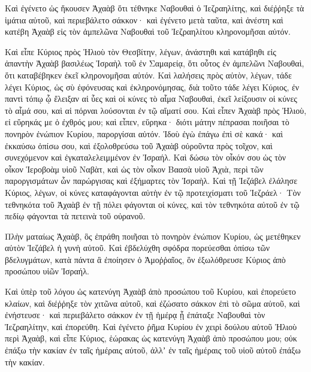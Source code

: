 {Καὶ ἐγένετο ὡς ἤκουσεν Ἀχαὰβ ὅτι τέθνηκε Ναβουθαὶ ὁ Ἰεζραηλίτης, καὶ διέῤῥηξε τὰ ἱμάτια αὐτοῦ, καὶ περιεβάλετο σάκκον· καὶ ἐγένετο μετὰ ταῦτα, καὶ ἀνέστη καὶ κατέβη Ἀχαὰβ εἰς τὸν ἀμπελῶνα Ναβουθαὶ τοῦ Ἰεζραηλίτου κληρονομῆσαι αὐτόν.
\par }{\PP {}Καὶ εἶπε Κύριος πρὸς Ἠλιοὺ τὸν Θεσβίτην, λέγων,
ἀνάστηθι καὶ κατάβηθι εἰς ἀπαντὴν Ἀχαὰβ βασιλέως Ἰσραὴλ τοῦ ἐν Σαμαρείᾳ, ὅτι οὗτος ἐν ἀμπελῶνι Ναβουθαὶ, ὅτι καταβέβηκεν ἐκεῖ κληρονομῆσαι αὐτόν.
Καὶ λαλήσεις πρὸς αὐτὸν, λέγων, τάδε λέγει Κύριος, ὡς σὺ ἐφόνευσας καὶ ἐκληρονόμησας, διὰ τοῦτο τάδε λέγει Κύριος, ἐν παντὶ τόπῳ ᾧ ἔλειξαν αἱ ὗες καὶ οἱ κύνες τὸ αἷμα Ναβουθαὶ, ἐκεῖ λείξουσιν οἱ κύνες τὸ αἷμά σου, καὶ αἱ πόρναι λούσονται ἐν τῷ αἵματί σου.
Καὶ εἶπεν Ἀχαὰβ πρὸς Ἠλιοὺ, εἰ εὕρηκάς με ὁ ἐχθρός μου; καὶ εἶπεν, εὕρηκα· διότι μάτην πέπρασαι ποιῆσαι τὸ πονηρὸν ἐνώπιον Κυρίου, παροργίσαι αὐτόν.
Ἰδοὺ ἐγὼ ἐπάγω ἐπὶ σὲ κακά· καὶ ἐκκαύσω ὀπίσω σου, καὶ ἐξολοθρεύσω τοῦ Ἀχαὰβ οὐροῦντα πρὸς τοῖχον, καὶ συνεχόμενον καὶ ἐγκαταλελειμμένον ἐν Ἰσραήλ.
Καὶ δώσω τὸν οἶκόν σου ὡς τὸν οἶκον Ἱεροβοὰμ υἱοῦ Ναβὰτ, καὶ ὡς τὸν οἶκον Βαασὰ υἱοῦ Ἀχιὰ, περὶ τῶν παροργισμάτων ὧν παρώργισας καὶ ἐξήμαρτες τὸν Ἰσραὴλ.
Καὶ τῇ Ἰεζάβελ ἐλάλησε Κύριος, λέγων, οἱ κύνες καταφάγονται αὐτὴν ἐν τῷ προτειχίσματι τοῦ Ἰεζράελ·
Τὸν τεθνηκότα τοῦ Ἀχαὰβ ἐν τῇ πόλει φάγονται οἱ κύνες, καὶ τὸν τεθνηκότα αὐτοῦ ἐν τῷ πεδίῳ φάγονται τὰ πετεινὰ τοῦ οὐρανοῦ.
\par }{\PP {}Πλὴν ματαίως Ἀχαὰβ, ὃς ἐπράθη ποιῆσαι τὸ πονηρὸν ἐνώπιον Κυρίου, ὡς μετέθηκεν αὐτὸν Ἰεζάβελ ἡ γυνὴ αὐτοῦ.
Καὶ ἐβδελύχθη σφόδρα πορεύεσθαι ὀπίσω τῶν βδελυγμάτων, κατὰ πάντα ἃ ἐποίησεν ὁ Ἀμοῤῥαῖος, ὃν ἐξωλόθρευσε Κύριος ἀπὸ προσώπου υἱῶν Ἰσραήλ.
\par }{\PP {}Καὶ ὑπὲρ τοῦ λόγου ὡς κατενύγη Ἀχαὰβ ἀπὸ προσώπου τοῦ Κυρίου, καὶ ἐπορεύετο κλαίων, καὶ διέῤῥηξε τὸν χιτῶνα αὐτοῦ, καὶ ἐζώσατο σάκκον ἐπὶ τὸ σῶμα αὐτοῦ, καὶ ἐνήστευσε· καὶ περιεβάλετο σάκκον ἐν τῇ ἡμέρᾳ ᾗ ἐπάταξε Ναβουθαὶ τὸν Ἰεζραηλίτην, καὶ ἐπορεύθη.
Καὶ ἐγένετο ῥῆμα Κυρίου ἐν χειρὶ δούλου αὐτοῦ Ἠλιοὺ περὶ Ἀχαὰβ, καὶ εἶπε Κύριος,
ἑώρακας ὡς κατενύγη Ἀχαὰβ ἀπὸ προσώπου μου; οὐκ ἐπάξω τὴν κακίαν ἐν ταῖς ἡμέραις αὐτοῦ, ἀλλʼ ἐν ταῖς ἡμέραις τοῦ υἱοῦ αὐτοῦ ἐπάξω τὴν κακίαν.

}
